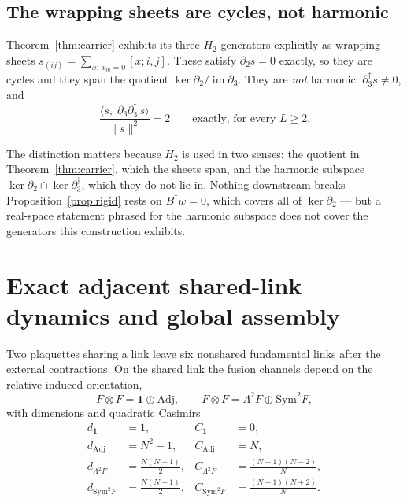 \documentclass[11pt]{article}
\theoremstyle{plain}
\theoremstyle{definition}
\theoremstyle{remark}
\newcommand{\chk}[1]{}
\newcommand{\dg}{^{\dagger}}
\begin{document}
\subsection{The wrapping sheets are cycles, not harmonic}

Theorem~\ref{thm:carrier} exhibits its three $H_2$ generators explicitly as
wrapping sheets $s_{(ij)}=\sum_{x:\,x_m=0}[x;i,j]$. These satisfy
$\partial_2 s=0$ exactly, so they are cycles and they span the quotient
$\ker\partial_2/\operatorname{im}\partial_3$. They are \emph{not} harmonic:
$\partial_3\dg s\neq0$, and
\begin{equation}
  \frac{\langle s,\;\partial_3\partial_3\dg\,s\rangle}{\|s\|^2}=2
  \qquad\text{exactly, for every }L\ge2 .
\end{equation}
\chk{FINDING: the wrapping sheets are cycles but NOT harmonic}

The distinction matters because $H_2$ is used in two senses: the quotient in
Theorem~\ref{thm:carrier}, which the sheets span, and the harmonic subspace
$\ker\partial_2\cap\ker\partial_3\dg$, which they do not lie in. Nothing
downstream breaks --- Proposition~\ref{prop:rigid} rests on $B\dg w=0$, which
covers all of $\ker\partial_2$ --- but a real-space statement phrased for the
harmonic subspace does not cover the generators this construction exhibits.

\section{Exact adjacent shared-link dynamics and global assembly}
\label{sec:second}

Two plaquettes sharing a link leave six nonshared fundamental links after the
external contractions. On the shared link the fusion channels depend on the
relative induced orientation,
\begin{equation}\label{eq:fusion}
  F\otimes\bar F=\mathbf{1}\oplus\mathrm{Adj},
  \qquad
  F\otimes F=\Lambda^2F\oplus\mathrm{Sym}^2F ,
\end{equation}
with dimensions and quadratic Casimirs
\begin{equation}\label{eq:table}
\begin{aligned}
  d_{\mathbf 1}&=1, & C_{\mathbf 1}&=0,\\
  d_{\mathrm{Adj}}&=N^2-1, & C_{\mathrm{Adj}}&=N,\\
  d_{\Lambda^2F}&=\tfrac{N(N-1)}2, & C_{\Lambda^2F}&=\tfrac{(N+1)(N-2)}N,\\
  d_{\mathrm{Sym}^2F}&=\tfrac{N(N+1)}2, & C_{\mathrm{Sym}^2F}&=\tfrac{(N-1)(N+2)}N.
\end{aligned}
\end{equation}
\end{document}
